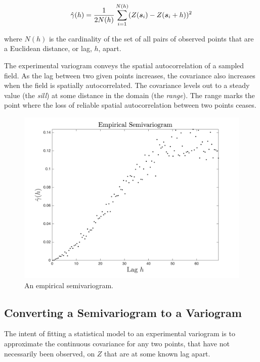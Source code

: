 \begin{equation}
    \label{eq:exp_var}
    \hat{\gamma}(h) = \frac{1}{2N(h)}\sum_{i=1}^{N(h)} (Z({\it{\boldsymbol{s}}}_i) - Z({\it{\boldsymbol{s}}}_i+h))^2
\end{equation}

\noindent where $N(h)$ is the cardinality of the set of all pairs of observed points that are a Euclidean distance, or lag, $h$, apart.

The experimental variogram conveys the spatial autocorrelation of a sampled field. As the lag between two given points increases, the covariance also increases when the field is spatially autocorrelated. The covariance levels out to a steady value (the \textit{sill}) at some distance in the domain (the \textit{range}). The range marks the point where the loss of reliable spatial autocorrelation between two points ceases.

\begin{figure}[ht!]
    \centering    
    \includegraphics[width=0.8\linewidth]{figures/exp_variogram.png}
    \ssp
    \caption{An empirical semivariogram.}
    \label{fig:emp_semiv}
\end{figure}

\subsection{Converting a Semivariogram to a Variogram} \label{sec:semitovar}
The intent of fitting a statistical model to an experimental variogram is to approximate the continuous covariance for any two points, that have not necessarily been observed, on $Z$ that are at some known lag apart.

